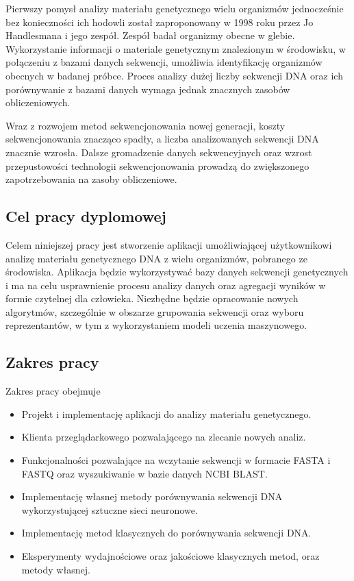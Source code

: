     Pierwszy pomysł analizy materiału genetycznego wielu organizmów jednocześnie bez konieczności ich hodowli został zaproponowany w 1998 roku przez Jo Handlesmana i jego zespół\cite{Handelsman:1998}. Zespół badał organizmy obecne w glebie. Wykorzystanie informacji o materiale genetycznym znalezionym w środowisku, w połączeniu z bazami danych sekwencji, umożliwia  identyfikację organizmów obecnych w badanej próbce. Proces analizy dużej liczby sekwencji DNA oraz ich porównywanie z bazami danych wymaga jednak znacznych zasobów obliczeniowych.

    Wraz z rozwojem metod sekwencjonowania nowej generacji\cite{Reinartz:2002}, koszty sekwencjonowania znacząco spadły, a liczba analizowanych sekwencji DNA znacznie wzrosła\cite{Muir:2016}. Dalsze gromadzenie danych sekwencyjnych oraz wzrost przepustowości technologii sekwencjonowania prowadzą do zwiększonego zapotrzebowania na zasoby obliczeniowe.

    \subsection{Cel pracy dyplomowej}

        Celem niniejszej pracy jest stworzenie aplikacji umożliwiającej użytkownikowi analizę materiału genetycznego DNA z wielu organizmów, pobranego ze środowiska. Aplikacja będzie wykorzystywać bazy danych sekwencji genetycznych i ma na celu usprawnienie procesu analizy danych oraz agregacji wyników w formie czytelnej dla człowieka. Niezbędne będzie opracowanie nowych algorytmów, szczególnie w obszarze grupowania sekwencji oraz wyboru reprezentantów, w tym z wykorzystaniem modeli uczenia maszynowego.

    \subsection {Zakres pracy}

        Zakres pracy obejmuje
        \begin{itemize}
            \item {
                Projekt i implementację aplikacji do analizy materiału genetycznego.
            }
            \item {
                Klienta przeglądarkowego pozwalającego na zlecanie nowych analiz.
            }
            \item {
                Funkcjonalności pozwalające na wczytanie sekwencji w formacie FASTA i FASTQ oraz wyszukiwanie w bazie danych NCBI BLAST.
            }
            \item {
                Implementację własnej metody porównywania sekwencji DNA wykorzystującej sztuczne sieci neuronowe.
            }
            \item {
                Implementację metod klasycznych do porównywania sekwencji DNA.
            }
            \item {
                Eksperymenty wydajnościowe oraz jakościowe klasycznych metod, oraz metody własnej.
            }
        \end{itemize}

